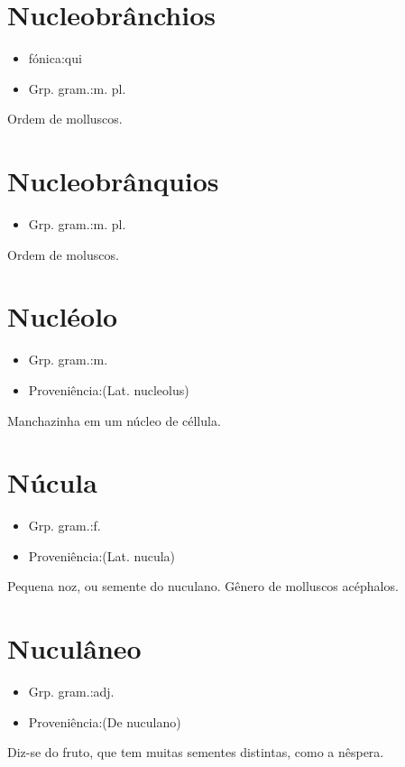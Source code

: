 \section{Nucleobrânchios}
\begin{itemize}
\item {fónica:qui}
\end{itemize}
\begin{itemize}
\item {Grp. gram.:m. pl.}
\end{itemize}
Ordem de molluscos.
\section{Nucleobrânquios}
\begin{itemize}
\item {Grp. gram.:m. pl.}
\end{itemize}
Ordem de moluscos.
\section{Nucléolo}
\begin{itemize}
\item {Grp. gram.:m.}
\end{itemize}
\begin{itemize}
\item {Proveniência:(Lat. \textunderscore nucleolus\textunderscore )}
\end{itemize}
Manchazinha em um núcleo de céllula.
\section{Núcula}
\begin{itemize}
\item {Grp. gram.:f.}
\end{itemize}
\begin{itemize}
\item {Proveniência:(Lat. \textunderscore nucula\textunderscore )}
\end{itemize}
Pequena noz, ou semente do nuculano.
Gênero de molluscos acéphalos.
\section{Nuculâneo}
\begin{itemize}
\item {Grp. gram.:adj.}
\end{itemize}
\begin{itemize}
\item {Proveniência:(De \textunderscore nuculano\textunderscore )}
\end{itemize}
Diz-se do fruto, que tem muitas sementes distintas, como a nêspera.
